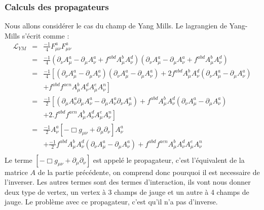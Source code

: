 \documentclass[a4paper,11pt]{article} %
\theoremstyle{plain}
\theoremstyle{definition}
\theoremstyle{remark}
\numberwithin{equation}{section}
\numberwithin{equation}{subsection}
\numberwithin{figure}{section}
\begin{document}
    \subsubsection{Calculs des  propagateurs}

\noindent
Nous allons considérer le cas du champ de Yang Mills. Le lagrangien de Yang-Mills s'écrit comme :
\begin{eqnarray*}
\mathcal{L}_{YM}   &=&  \frac{-1}{4} F^{a}_{\mu\nu}F^{a}_{\mu \nu}  \\
                                  &=&   \frac{-1}{4} 
\left(   \partial_{\nu}A^{a}_{\mu} - \partial_{\mu}A^{a}_{\nu} + f^{abd}A^{b}_{\mu}A^{d}_{\nu}  \right)
\left(   \partial_{\nu}A^{a}_{\mu} - \partial_{\mu}A^{a}_{\nu} + f^{abd}A^{b}_{\mu}A^{d}_{\nu}  \right)  \\
                                  &=&   \frac{-1}{4}  
\left[
\left(   \partial_{\nu}A^{a}_{\mu} - \partial_{\mu}A^{a}_{\nu} \right)
\left(   \partial_{\nu}A^{a}_{\mu} - \partial_{\mu}A^{a}_{\nu} \right)
+ 2 f^{abd}  A^{b}_{\mu}A^{d}_{\nu}  \left(   \partial_{\nu}A^{a}_{\mu} - \partial_{\mu}A^{a}_{\nu} \right)  \right. \nonumber \\
&& \left. +  f^{abd}  f^{aen}  A^{b}_{\mu}A^{d}_{\nu}  A^{e}_{\mu}A^{n}_{\nu}
\right] \\
                                  &=&   \frac{-1}{2}  \left[
\left(   \partial_{\mu}A^{a}_{\nu} \partial_{\mu}A^{a}_{\nu} - \partial_{\mu}A^{a}_{\nu} \partial_{\nu}A^{a}_{\mu}\right)
+  f^{abd}  A^{b}_{\mu}A^{d}_{\nu}  \left(   \partial_{\nu}A^{a}_{\mu} - \partial_{\mu}A^{a}_{\nu} \right) \right. \nonumber  \\
&& \left. +  2. f^{abd}  f^{aen}  A^{b}_{\mu}A^{d}_{\nu}  A^{e}_{\mu}A^{n}_{\nu}  \right]  \\
                                 &=&   \frac{-1}{2}
A^{a}_{\nu}  \left[   - \Box g_{\mu \nu} +  \partial_{\mu} \partial_{\nu}  \right] A^{a}_{\nu} \\
&&    +   \frac{-1}{2}  f^{abd}  A^{b}_{\mu}A^{d}_{\nu}  \left(   \partial_{\nu}A^{a}_{\mu} - \partial_{\mu}A^{a}_{\nu} \right)
+   f^{abd}  f^{aen}  A^{b}_{\mu}A^{d}_{\nu}  A^{e}_{\mu}A^{n}_{\nu}   \nonumber \\
\end{eqnarray*}
Le terme $\left[   - \Box g_{\mu \nu} +  \partial_{\mu} \partial_{\nu}  \right]$ est appelé le propagateur, c'est l'équivalent de 
la matrice $A$ de la partie précédente, on comprend donc pourquoi il est necessaire de l'inverser. Les autres termes sont des termes d'interaction, 
ils vont nous donner deux type de vertex, un vertex à 3 champs de jauge et un autre à 4 champs de jauge.
Le problème avec ce propagateur, c'est qu'il n'a pas d'inverse.\\
\end{document}
